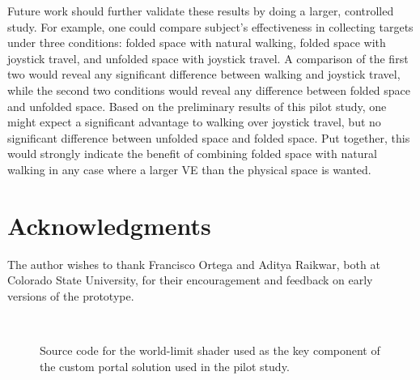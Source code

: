 \documentclass{sigchi}
\begin{document}
Future work should further validate these results by doing a larger, controlled study.  For example, one could compare subject’s effectiveness in collecting targets under three conditions: folded space with natural walking, folded space with joystick travel, and unfolded space with joystick travel.  A comparison of the first two would reveal any significant difference between walking and joystick travel, while the second two conditions would reveal any difference between folded space and unfolded space.  Based on the preliminary results of this pilot study, one might expect a significant advantage to walking over joystick travel, but no significant difference between unfolded space and folded space.  Put together, this would strongly indicate the benefit of combining folded space with natural walking in any case where a larger VE than the physical space is wanted.

\section{Acknowledgments}

The author wishes to thank Francisco Ortega and Aditya Raikwar, both at Colorado State University, for their encouragement and feedback on early versions of the prototype.

\begin{figure}

  \caption{Source code for the world-limit shader used as the key component of the custom portal solution used in the pilot study.}~\label{lst:worldLimitShader}
\end{figure}


%
%
%
%
%
\balance{}



\end{document}
